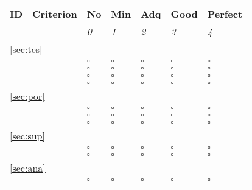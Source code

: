 \documentclass[a4paper,11pt]{article}
\begin{document}
\begin{table}[hbt]
	\begin{tabular}
		{ p{} | 
		  p{} |
		  p{} |
		  p{} |
		  p{} |
		  p{} |
		  p{} }
        \hline
		\textbf{ID} & \textbf{Criterion} & \textbf{No} & \textbf{Min} & \textbf{Adq} & \textbf{Good} & \textbf{Perfect} \\
                                        & & \emph{0} & \emph{1} & \emph{2} & \emph{3} & \emph{4} \\
        \hline 
        		\multicolumn{7}{l}{\ref{sec:tes}{ }\nameref{sec:tes}} \\
		\hline
		\hyperref[id:TS1]{\tsOneID} & \tsOneText & $\square$ & $\square$ & $\square$ & $\square$ & $\square$ \\
		\hyperref[id:TS2]{\tsTwoID} & \tsTwoText & $\square$ & $\square$ & $\square$ & $\square$ & $\square$ \\
		\hyperref[id:TS3]{\tsThreeID} & \tsThreeText & $\square$ & $\square$ & $\square$ & $\square$ & $\square$ \\
		\hyperref[id:TS4]{\tsFourID} & \tsFourText & $\square$ & $\square$ & $\square$ & $\square$ & $\square$ \\
		\hline
        \multicolumn{7}{l}{\ref{sec:por}{ }\nameref{sec:por}} \\
		\hline	
		\hyperref[id:PB1]{\pbOneID} & \pbOneText & $\square$ & $\square$ & $\square$ & $\square$ & $\square$ \\
		\hyperref[id:PB2]{\pbTwoID} & \pbTwoText & $\square$ & $\square$ & $\square$ & $\square$ & $\square$ \\
		\hyperref[id:PB3]{\pbThreeID} & \pbThreeText & $\square$ & $\square$ & $\square$ & $\square$ & $\square$ \\
		\hline	
		\multicolumn{7}{l}{\ref{sec:sup}{ }\nameref{sec:sup}} \\
		\hline	
		\hyperref[id:SP1]{\spOneID} & \spOneText & $\square$ & $\square$ & $\square$ & $\square$ & $\square$ \\
		\hyperref[id:SP2]{\spTwoID} & \spTwoText & $\square$ & $\square$ & $\square$ & $\square$ & $\square$ \\
		\hline
		\multicolumn{7}{l}{\ref{sec:ana}{ }\nameref{sec:ana}} \\
		\hline	
		\hyperref[id:AN1]{\anOneID} & \anOneText & $\square$ & $\square$ & $\square$ & $\square$ & $\square$ \\

\end{tabular}
\end{table}
\end{document}
